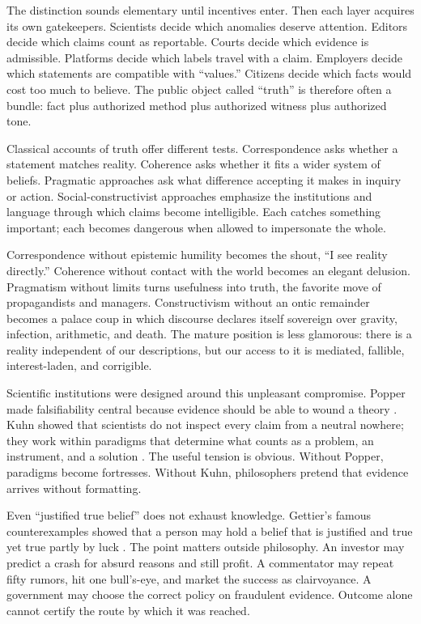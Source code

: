 ﻿\documentclass[12pt,a4paper]{book}
\begin{document}
The distinction sounds elementary until incentives enter. Then each layer acquires its own gatekeepers. Scientists decide which anomalies deserve attention. Editors decide which claims count as reportable. Courts decide which evidence is admissible. Platforms decide which labels travel with a claim. Employers decide which statements are compatible with “values.” Citizens decide which facts would cost too much to believe. The public object called “truth” is therefore often a bundle: fact plus authorized method plus authorized witness plus authorized tone.

Classical accounts of truth offer different tests. Correspondence asks whether a statement matches reality. Coherence asks whether it fits a wider system of beliefs. Pragmatic approaches ask what difference accepting it makes in inquiry or action. Social-constructivist approaches emphasize the institutions and language through which claims become intelligible. Each catches something important; each becomes dangerous when allowed to impersonate the whole.

Correspondence without epistemic humility becomes the shout, “I see reality directly.” Coherence without contact with the world becomes an elegant delusion. Pragmatism without limits turns usefulness into truth, the favorite move of propagandists and managers. Constructivism without an ontic remainder becomes a palace coup in which discourse declares itself sovereign over gravity, infection, arithmetic, and death. The mature position is less glamorous: there is a reality independent of our descriptions, but our access to it is mediated, fallible, interest-laden, and corrigible.

Scientific institutions were designed around this unpleasant compromise. Popper made falsifiability central because evidence should be able to wound a theory \cite{popper-en}. Kuhn showed that scientists do not inspect every claim from a neutral nowhere; they work within paradigms that determine what counts as a problem, an instrument, and a solution \cite{kuhn}. The useful tension is obvious. Without Popper, paradigms become fortresses. Without Kuhn, philosophers pretend that evidence arrives without formatting.

Even “justified true belief” does not exhaust knowledge. Gettier's famous counterexamples showed that a person may hold a belief that is justified and true yet true partly by luck \cite{Gettier1963}. The point matters outside philosophy. An investor may predict a crash for absurd reasons and still profit. A commentator may repeat fifty rumors, hit one bull's-eye, and market the success as clairvoyance. A government may choose the correct policy on fraudulent evidence. Outcome alone cannot certify the route by which it was reached.
\end{document}
